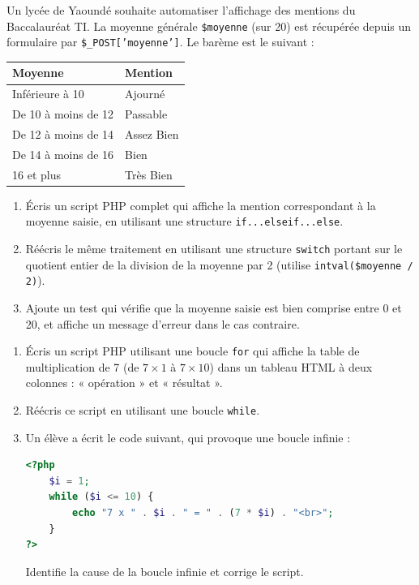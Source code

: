 \documentclass[11pt]{article}
\newcounter{popsec}
\newcounter{popsub}
\newcommand{\courssub}[1]{%
  \stepcounter{popsub}%
  \par\vspace{9pt}\noindent{\popxbold\fontsize{11.5}{13}\selectfont\color{popink}{\color{poporange}\thepopsec.\thepopsub}\hspace{6pt}#1}\par\nopagebreak\vspace{4pt}
}
\begin{document}
\courssub{Je m'entraîne}

\begin{exercice}
Un lycée de Yaoundé souhaite automatiser l'affichage des mentions du Baccalauréat TI. La moyenne générale \texttt{\$moyenne} (sur 20) est récupérée depuis un formulaire par \texttt{\$\_POST['moyenne']}. Le barème est le suivant :
\begin{center}
\begin{tabularx}{\linewidth}{|l|X|}
\hline
\rowcolor{popblueL} \textbf{Moyenne} & \textbf{Mention} \\
\hline
Inférieure à 10 & Ajourné \\
\hline
De 10 à moins de 12 & Passable \\
\hline
De 12 à moins de 14 & Assez Bien \\
\hline
De 14 à moins de 16 & Bien \\
\hline
16 et plus & Très Bien \\
\hline
\end{tabularx}
\end{center}
\begin{enumerate}
\item Écris un script PHP complet qui affiche la mention correspondant à la moyenne saisie, en utilisant une structure \texttt{if...elseif...else}.
\item Réécris le même traitement en utilisant une structure \texttt{switch} portant sur le quotient entier de la division de la moyenne par 2 (utilise \texttt{intval(\$moyenne / 2)}).
\item Ajoute un test qui vérifie que la moyenne saisie est bien comprise entre 0 et 20, et affiche un message d'erreur dans le cas contraire.
\end{enumerate}
\end{exercice}

\begin{exercice}
\begin{enumerate}
\item Écris un script PHP utilisant une boucle \texttt{for} qui affiche la table de multiplication de 7 (de $7 \times 1$ à $7 \times 10$) dans un tableau HTML à deux colonnes : « opération » et « résultat ».
\item Réécris ce script en utilisant une boucle \texttt{while}.
\item Un élève a écrit le code suivant, qui provoque une boucle infinie :
\begin{lstlisting}[language=Php]
<?php
    $i = 1;
    while ($i <= 10) {
        echo "7 x " . $i . " = " . (7 * $i) . "<br>";
    }
?>
\end{lstlisting}
Identifie la cause de la boucle infinie et corrige le script.
\end{enumerate}
\end{exercice}
\end{document}
